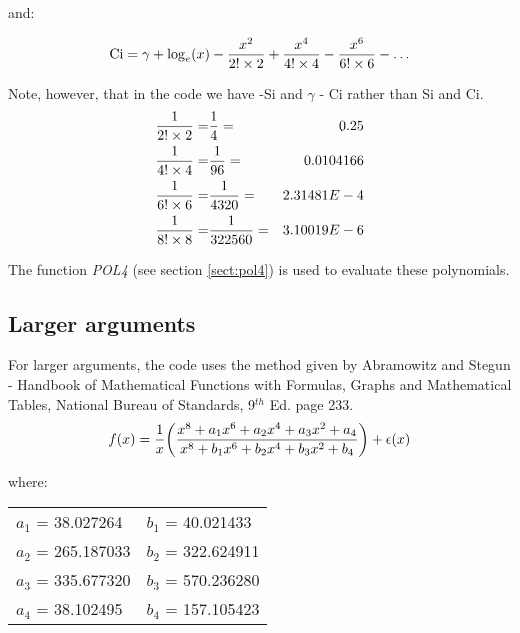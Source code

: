 \noindent and:

\begin{equation}
\mathrm{Ci} = \gamma + \log_e(x) - {x^2 \over 2! \times 2} +
{x^4 \over 4! \times 4} - {x^6 \over 6! \times 6} - \ldots
\end{equation}

\noindent Note, however, that in the code we have -Si and $\gamma$ - Ci
rather than Si and Ci.\\

\begin{eqnarray*}
{1 \over 2! \times 2} =& {1 \over 4}      =& 0.25\\
{1 \over 4! \times 4} =& {1 \over 96}     =& 0.0104166\\
{1 \over 6! \times 6} =& {1 \over 4320}   =& 2.31481E-4\\
{1 \over 8! \times 8} =& {1 \over 322560} =& 3.10019E-6
\end{eqnarray*}

\noindent The function {\em POL4} (see section \ref{sect:pol4}) is used to
evaluate these polynomials.\\

\subsection{Larger arguments}

\noindent For larger arguments, the code uses the method given by Abramowitz
and Stegun - Handbook of Mathematical Functions with Formulas, Graphs and
Mathematical Tables, National Bureau of Standards, 9$^{th}$ Ed. page 233.\\

\begin{equation}
f(x) = {1 \over x}
\bigg({x^8 + a_1 x^6 + a_2 x^4 + a_3 x^2 + a_4 \over x^8 + b_1 x^6 + b_2 x^4 + b_3 x^2 + b_4}\bigg)
+ \epsilon(x)
\end{equation}

\noindent where:\\

\begin{center}
\begin{tabular}{|ll|}
\hline
$a_1$ = 38.027264 & $b_1$ = 40.021433\\
$a_2$ = 265.187033 & $b_2$ = 322.624911\\
$a_3$ = 335.677320 & $b_3$ = 570.236280\\
$a_4$ = 38.102495 & $b_4$ = 157.105423\\
\hline
\end{tabular}
\end{center}


